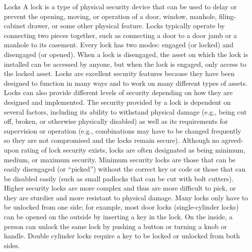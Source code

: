 \documentclass{article}
\begin{document}
Locks A lock is a type of physical security device that can be used to
delay or prevent the opening, moving, or operation of a door, window,
manhole, filing-cabinet drawer, or some other physical feature. Locks
typically operate by connecting two pieces together, such as connecting
a door to a door jamb or a manhole to its casement. Every lock has two
modes: engaged (or locked) and disengaged (or opened). When a lock is
disengaged, the asset on which the lock is installed can be accessed by
anyone, but when the lock is engaged, only access to the locked asset.
Locks are excellent security features because they have been designed to
function in many ways and to work on many different types of assets.
Locks can also provide different levels of security depending on how
they are designed and implemented. The security provided by a lock is
dependent on several factors, including its ability to withstand
physical damage (e.g., being cut off, broken, or otherwise physically
disabled) as well as its requirements for supervision or operation
(e.g., combinations may have to be changed frequently so they are not
compromised and the locks remain secure). Although no agreed-upon rating
of lock security exists, locks are often designated as being minimum,
medium, or maximum security. Minimum security locks are those that can
be easily disengaged (or ``picked'') without the correct key or code or
those that can be disabled easily (such as small padlocks that can be
cut with bolt cutters). Higher security locks are more complex and thus
are more difficult to pick, or they are sturdier and more resistant to
physical damage. Many locks only have to be unlocked from one side; for
example, most door locks (single-cylinder locks) can be opened on the
outside by inserting a key in the lock. On the inside, a person can
unlock the same lock by pushing a button or turning a knob or handle.
Double cylinder locks require a key to be locked or unlocked from both
sides.
\end{document}
